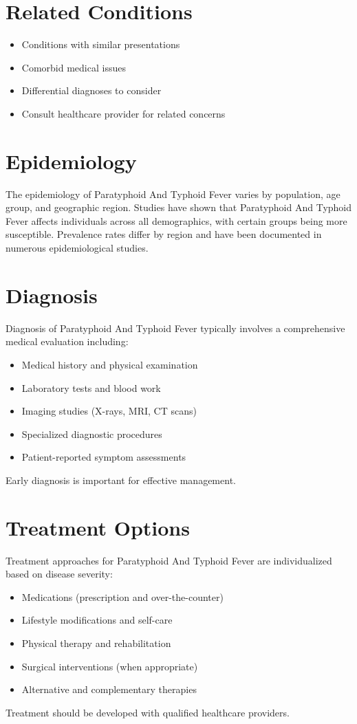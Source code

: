 \section*{Related Conditions}
\begin{itemize}
  \item Conditions with similar presentations
  \item Comorbid medical issues
  \item Differential diagnoses to consider
  \item Consult healthcare provider for related concerns
\end{itemize}

\section*{Epidemiology}
The epidemiology of Paratyphoid And Typhoid Fever varies by population, age group, and geographic region. Studies have shown that Paratyphoid And Typhoid Fever affects individuals across all demographics, with certain groups being more susceptible. Prevalence rates differ by region and have been documented in numerous epidemiological studies.

\section*{Diagnosis}
Diagnosis of Paratyphoid And Typhoid Fever typically involves a comprehensive medical evaluation including:
\begin{itemize}
  \item Medical history and physical examination
  \item Laboratory tests and blood work
  \item Imaging studies (X-rays, MRI, CT scans)
  \item Specialized diagnostic procedures
  \item Patient-reported symptom assessments
\end{itemize}
Early diagnosis is important for effective management.

\section*{Treatment Options}
Treatment approaches for Paratyphoid And Typhoid Fever are individualized based on disease severity:
\begin{itemize}
  \item Medications (prescription and over-the-counter)
  \item Lifestyle modifications and self-care
  \item Physical therapy and rehabilitation
  \item Surgical interventions (when appropriate)
  \item Alternative and complementary therapies
\end{itemize}
Treatment should be developed with qualified healthcare providers.

